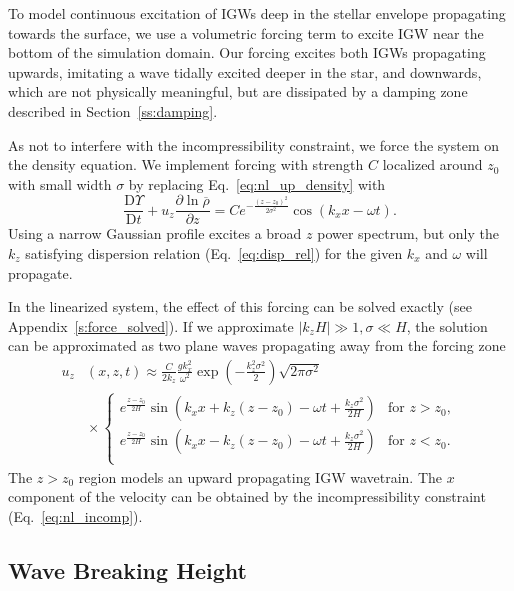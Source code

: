 \documentclass[
        fleqn,
        usenatbib,
        referee,
    ]{mnras}
\newcommand*{\pd}[2]{\frac{\partial#1}{\partial#2}}
\newcommand*{\md}[2]{\frac{\mathrm{D}#1}{\mathrm{D}#2}}
\newcommand*{\abs}[1]{\left|#1\right|}
\newcommand*{\p}[1]{\left(#1\right)}
\begin{document}
To model continuous excitation of IGWs deep in the stellar envelope propagating
towards the surface, we use a volumetric forcing term to excite IGW near the
bottom of the simulation domain. Our forcing excites both IGWs
propagating upwards, imitating a wave tidally excited deeper in the star, and
downwards, which are not physically meaningful, but are dissipated by a
damping zone described in Section~\ref{ss:damping}.

As not to interfere with the incompressibility constraint, we force the system
on the density equation. We implement forcing with strength $C$ localized around
$z_0$ with small width $\sigma$ by replacing Eq.~\eqref{eq:nl_up_density}
with
\begin{equation}
    \md{\Upsilon}{t} + u_{z}\pd{\ln \overline{\rho}}{z}
        = Ce^{-\frac{(z - z_0)^2}{2\sigma^2}}
            \cos \p{k_{x}x - \omega t}.\label{eq:vol_drive}
\end{equation}
Using a narrow Gaussian profile excites a broad $z$ power spectrum, but only the
$k_{z}$ satisfying dispersion relation (Eq.~\eqref{eq:disp_rel}) for the given
$k_{x}$ and $\omega$ will propagate.

In the linearized system, the effect of this forcing can be solved exactly
(see Appendix~\ref{s:force_solved}). If we approximate $\abs{k_zH} \gg 1, \sigma
\ll H$, the solution can be approximated as two plane waves propagating away
from the forcing zone
\begin{align}
    u_{z}&(x, z, t) \approx{} \frac{C}{2k_z}\frac{gk_x^2}{\omega^2}
        \exp\p{-\frac{k_z^2\sigma^2}{2}}
        \sqrt{2\pi \sigma^2} \nonumber\\
        &{}\times\begin{cases}
        e^{\frac{z - z_0}{2H}}\sin\p{k_{x}x + k_{z}(z - z_0) - \omega t
            + \frac{k_z\sigma^2}{2H}}
            & \text{for }z > z_0,\\[5pt]
        e^{\frac{z - z_0}{2H}}\sin\p{k_{x}x - k_{z}(z - z_0) - \omega t
            + \frac{k_z\sigma^2}{2H}}
            & \text{for }z < z_0.\\
    \end{cases}\label{eq:uz_lin}
\end{align}
The $z > z_0$ region models an upward propagating IGW wavetrain. The $x$
component of the velocity can be obtained by the incompressibility constraint
(Eq.~\eqref{eq:nl_incomp}).

\subsection{Wave Breaking Height}\label{ss:wave_breaking}
\end{document}
